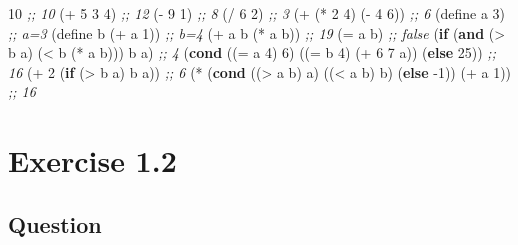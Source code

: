 \documentclass[
]{article}
\newenvironment{Shaded}{}{}
\newcommand{\CommentTok}[1]{\textcolor[rgb]{0.38,0.63,0.69}{\textit{#1}}}
\newcommand{\DecValTok}[1]{\textcolor[rgb]{0.25,0.63,0.44}{#1}}
\newcommand{\ExtensionTok}[1]{#1}
\newcommand{\FunctionTok}[1]{\textcolor[rgb]{0.02,0.16,0.49}{#1}}
\newcommand{\KeywordTok}[1]{\textcolor[rgb]{0.00,0.44,0.13}{\textbf{#1}}}
\newcommand{\NormalTok}[1]{#1}
\newcommand{\OperatorTok}[1]{\textcolor[rgb]{0.40,0.40,0.40}{#1}}
\begin{document}
\begin{Shaded}
\begin{Highlighting}[numbers=left,,]
\DecValTok{10} \CommentTok{;; 10}
\NormalTok{(}\OperatorTok{+} \DecValTok{5} \DecValTok{3} \DecValTok{4}\NormalTok{) }\CommentTok{;; 12}
\NormalTok{(}\OperatorTok{{-}} \DecValTok{9} \DecValTok{1}\NormalTok{) }\CommentTok{;; 8}
\NormalTok{(}\OperatorTok{/} \DecValTok{6} \DecValTok{2}\NormalTok{) }\CommentTok{;; 3}
\NormalTok{(}\OperatorTok{+}\NormalTok{ (}\OperatorTok{*} \DecValTok{2} \DecValTok{4}\NormalTok{) (}\OperatorTok{{-}} \DecValTok{4} \DecValTok{6}\NormalTok{)) }\CommentTok{;; 6}
\NormalTok{(}\ExtensionTok{define}\FunctionTok{ a }\DecValTok{3}\NormalTok{) }\CommentTok{;; a=3}
\NormalTok{(}\ExtensionTok{define}\FunctionTok{ b }\NormalTok{(}\OperatorTok{+}\NormalTok{ a }\DecValTok{1}\NormalTok{)) }\CommentTok{;; b=4}
\NormalTok{(}\OperatorTok{+}\NormalTok{ a b (}\OperatorTok{*}\NormalTok{ a b)) }\CommentTok{;; 19}
\NormalTok{(}\OperatorTok{=}\NormalTok{ a b) }\CommentTok{;; false}
\NormalTok{(}\KeywordTok{if}\NormalTok{ (}\KeywordTok{and}\NormalTok{ (}\OperatorTok{\textgreater{}}\NormalTok{ b a) (}\OperatorTok{\textless{}}\NormalTok{ b (}\OperatorTok{*}\NormalTok{ a b)))}
\NormalTok{    b}
\NormalTok{    a) }\CommentTok{;; 4}
\NormalTok{(}\KeywordTok{cond}\NormalTok{ ((}\OperatorTok{=}\NormalTok{ a }\DecValTok{4}\NormalTok{) }\DecValTok{6}\NormalTok{)}
\NormalTok{      ((}\OperatorTok{=}\NormalTok{ b }\DecValTok{4}\NormalTok{) (}\OperatorTok{+} \DecValTok{6} \DecValTok{7}\NormalTok{ a))}
\NormalTok{      (}\KeywordTok{else} \DecValTok{25}\NormalTok{)) }\CommentTok{;; 16}
\NormalTok{(}\OperatorTok{+} \DecValTok{2}\NormalTok{ (}\KeywordTok{if}\NormalTok{ (}\OperatorTok{\textgreater{}}\NormalTok{ b a) b a)) }\CommentTok{;; 6}
\NormalTok{(}\OperatorTok{*}\NormalTok{ (}\KeywordTok{cond}\NormalTok{ ((}\OperatorTok{\textgreater{}}\NormalTok{ a b) a)}
\NormalTok{         ((}\OperatorTok{\textless{}}\NormalTok{ a b) b)}
\NormalTok{         (}\KeywordTok{else}\NormalTok{ {-}}\DecValTok{1}\NormalTok{))}
\NormalTok{   (}\OperatorTok{+}\NormalTok{ a }\DecValTok{1}\NormalTok{)) }\CommentTok{;; 16}
\end{Highlighting}
\end{Shaded}

\hypertarget{exercise-1.2}{%
\section{Exercise 1.2}\label{exercise-1.2}}

\hypertarget{question-1}{%
\subsection{Question}\label{question-1}}
\end{document}

